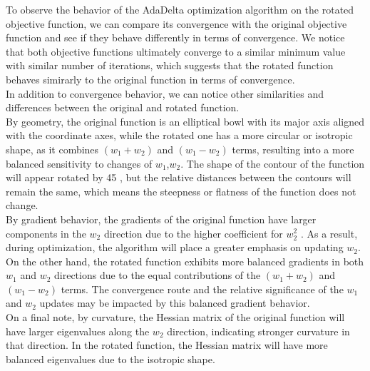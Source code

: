 To observe the behavior of the AdaDelta optimization algorithm on the rotated objective function, we can compare its convergence with the original objective function and see if they behave differently in terms of convergence. We notice that both objective functions ultimately converge to a similar minimum value with similar number of iterations, which suggests that the rotated function behaves simirarly to the original function in terms of convergence. \\

In addition to convergence behavior, we can notice other similarities and differences between the original and rotated function.\\
By geometry, the original function is an elliptical bowl with its major axis aligned with the coordinate axes, while the rotated one has a more circular or isotropic shape, as it combines $(w_1 + w_2)$ and $(w_1 - w_2)$ terms, resulting into a more balanced sensitivity to changes of $w_1$,$w_2$. The shape of the contour of the function will appear rotated by 45 \degree, but the relative distances between the contours will remain the same, which means the steepness or flatness of the function does not change.\\

By gradient behavior, the gradients of the original function have larger components in the $w_2$ direction due to the higher coefficient for $w_2^2$ . As a result, during optimization, the algorithm will place a greater emphasis on updating $w_2$. On the other hand, the rotated function exhibits more balanced gradients in both $w_1$ and $w_2$ directions due to the equal contributions of the $(w_1 + w_2)$ and $(w_1 - w_2)$ terms. The convergence route and the relative significance of the $w_1$ and $w_2$ updates may be impacted by this balanced gradient behavior.\\

On a final note, by curvature, the Hessian matrix of the original function will have larger eigenvalues along the $w_2$ direction, indicating stronger curvature in that direction.
In the rotated function, the Hessian matrix will have more balanced eigenvalues due to the isotropic shape.\\

